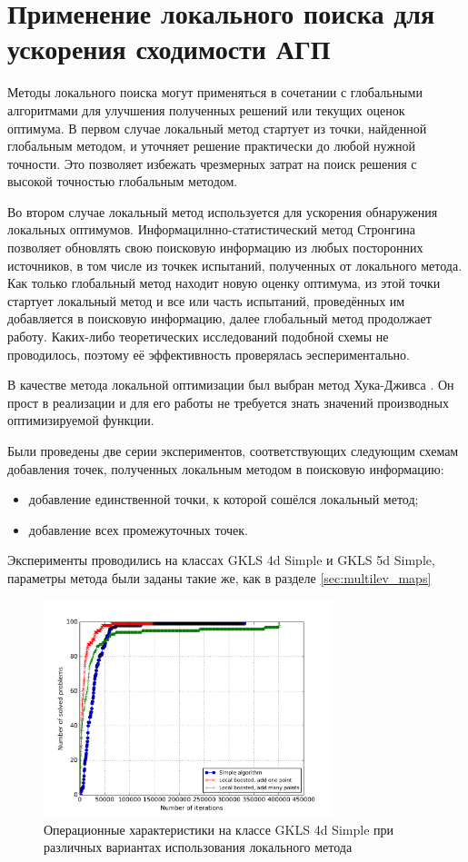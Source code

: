 \section{Применение локального поиска для ускорения сходимости АГП}
Методы локального поиска могут применяться в сочетании с глобальными алгоритмами для улучшения полученных решений или текущих оценок оптимума.
В первом случае локальный метод стартует из точки, найденной глобальным методом, и уточняет решение практически до любой нужной точности. Это
позволяет избежать чрезмерных затрат на поиск решения с высокой точностью глобальным методом.
\par
Во втором случае локальный метод используется для ускорения обнаружения локальных оптимумов.
Информацилнно-статистический метод Стронгина позволяет обновлять свою поисковую информацию из любых посторонних источников, в том числе из точкек испытаний,
полученных от локального метода.
Как только глобальный метод находит новую оценку оптимума, из этой точки стартует локальный метод и все или часть испытаний, проведённых им
добавляется в поисковую информацию, далее глобальный метод продолжает работу. Каких-либо теоретических исследований подобной схемы не проводилось, поэтому её эффективность проверялась эеспериментально.
\par
В качестве метода локальной оптимизации был выбран метод Хука-Дживса \cite{himmelblau}. Он прост в реализации и для его работы не требуется знать значений
 производных оптимизируемой функции.
\par
Были проведены две серии экспериментов, соответствующих следующим схемам добавления точек, полученных локальным методом в поисковую информацию:
\begin{itemize}
		\item добавление единственной точки, к которой сошёлся локальный метод;
    \item добавление всех промежуточных точек.
\end{itemize}
\par
Эксперименты проводились на классах GKLS 4d Simple и GKLS 5d Simple, параметры метода были заданы такие же, как в разделе \ref{sec:multilev_maps}
\begin{figure}[ht]
	\center
  \includegraphics[width=0.75\textwidth]{pictures/local_search_op.png}
  \caption{Операционные характеристики на классе GKLS 4d Simple при различных вариантах использования локального метода}
  \label{fig:loaclsearchOP}
\end{figure}
